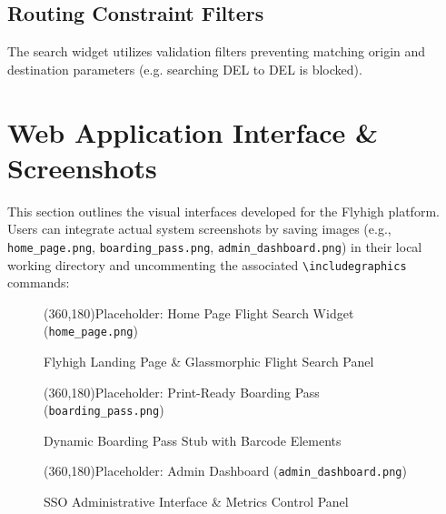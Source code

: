 \documentclass[12pt,a4paper]{article}
\begin{document}
\subsection{Routing Constraint Filters}
The search widget utilizes validation filters preventing matching origin and destination parameters (e.g. searching DEL to DEL is blocked).

\section{Web Application Interface \& Screenshots}
This section outlines the visual interfaces developed for the Flyhigh platform. Users can integrate actual system screenshots by saving images (e.g., \texttt{home\_page.png}, \texttt{boarding\_pass.png}, \texttt{admin\_dashboard.png}) in their local working directory and uncommenting the associated \texttt{\textbackslash includegraphics} commands:

\begin{figure}[htbp]
\centering
\begin{center}
\framebox(360,180){Placeholder: Home Page Flight Search Widget (\texttt{home\_page.png})}
\end{center}
\caption{Flyhigh Landing Page \& Glassmorphic Flight Search Panel}
\label{fig:ss_home}
\end{figure}

\begin{figure}[htbp]
\centering
\begin{center}
\framebox(360,180){Placeholder: Print-Ready Boarding Pass (\texttt{boarding\_pass.png})}
\end{center}
\caption{Dynamic Boarding Pass Stub with Barcode Elements}
\label{fig:ss_pass}
\end{figure}

\begin{figure}[htbp]
\centering
\begin{center}
\framebox(360,180){Placeholder: Admin Dashboard (\texttt{admin\_dashboard.png})}
\end{center}
\caption{SSO Administrative Interface \& Metrics Control Panel}
\label{fig:ss_admin}
\end{figure}
\end{document}
